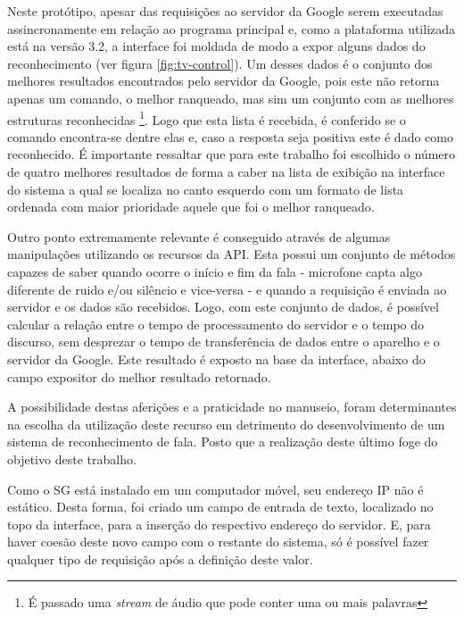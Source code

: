 \documentclass[12pt,a4paper,oneside]{report}
\begin{document}
Neste protótipo, apesar das requisições ao servidor da Google serem executadas assincronamente em relação ao programa principal e, como a  plataforma utilizada está na versão 3.2, a interface foi moldada de modo a expor alguns dados do reconhecimento (ver figura \ref{fig:tv-control}). Um desses dados é o conjunto dos melhores resultados encontrados pelo servidor da Google, pois este não retorna apenas um comando, o melhor ranqueado, mas sim um conjunto com as melhores estruturas reconhecidas \footnote{É passado uma \emph{stream} de áudio que pode conter uma ou mais palavras}. Logo que esta lista é recebida, é conferido se o comando encontra-se dentre elas e, caso a resposta seja positiva este é dado como reconhecido. É importante ressaltar que para este trabalho foi escolhido o número de quatro melhores resultados de forma a caber na lista de exibição na interface do sistema a qual se localiza no canto esquerdo com um formato de lista ordenada com maior prioridade aquele que foi o melhor ranqueado.

Outro ponto extremamente relevante é conseguido através de algumas manipulações utilizando os recursos da API. Esta possui um conjunto de métodos capazes de saber quando ocorre o início e fim da fala - microfone capta algo diferente de ruido e/ou silêncio e vice-versa - e quando a requisição é enviada ao servidor e os dados são recebidos. Logo, com este conjunto de dados, é possível calcular a relação entre o tempo de processamento do servidor e o tempo do discurso, sem desprezar o tempo de transferência de dados entre o aparelho e o servidor da Google. Este resultado é exposto na base da interface, abaixo do campo expositor do melhor resultado retornado.

A possibilidade destas aferições e a praticidade no manuseio, foram determinantes na escolha da utilização deste recurso em detrimento do desenvolvimento de um sistema de reconhecimento de fala. Posto que a realização deste último foge do objetivo deste trabalho.

Como o SG está instalado em um computador móvel, seu endereço IP não é estático. Desta forma, foi criado um campo de entrada de texto, localizado no topo da interface, para a inserção do respectivo endereço do servidor. E, para haver coesão deste novo campo com o restante do sistema, só é possível fazer qualquer tipo de requisição após a definição deste valor.
\end{document}
